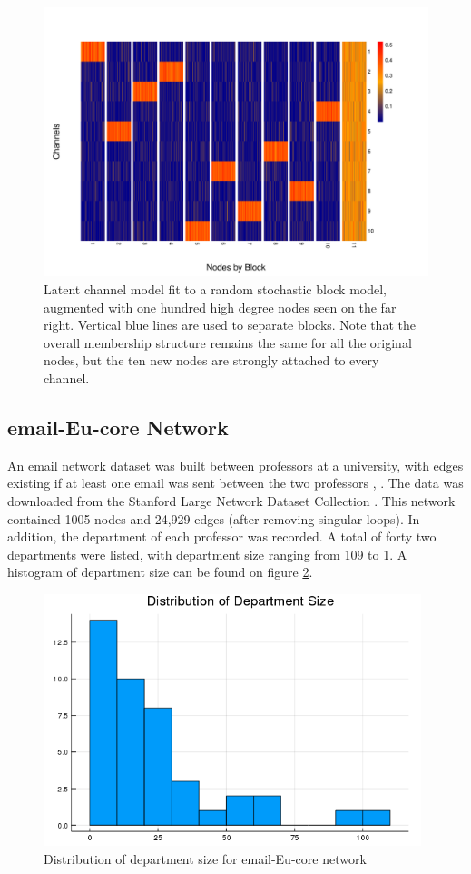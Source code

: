 \documentclass[11pt]{amsart}
\begin{document}
\begin{figure}
\includegraphics[width = 12cm]{augSBM.pdf}
\caption{Latent channel model fit to a random stochastic block model, augmented with one hundred high degree nodes seen on the far right. 
Vertical blue lines are used to separate blocks.
Note that the overall membership structure remains the same for all the original nodes, but the ten new nodes are strongly attached to every channel.}
\label{fig:sbmOutliers}
\end{figure}

\subsection{email-Eu-core Network}

An email network dataset was built between professors at a university, 
with edges existing if at least one email was sent between the two professors \cite{eu1}, \cite{eu2}. 
The data was downloaded from the Stanford Large Network Dataset Collection \cite{snapnets}.
This network contained 1005 nodes and 24,929 edges (after removing singular loops). In addition, the department 
of each professor was recorded. A total of forty two departments were listed, with department 
size ranging from 109 to 1. A histogram of department size can be found on figure \ref{fig:departSize}.

\begin{figure}
\includegraphics[width = 11cm]{departSize.png}
\caption{Distribution of department size for email-Eu-core network}
\label{fig:departSize}
\end{figure}
\end{document}
